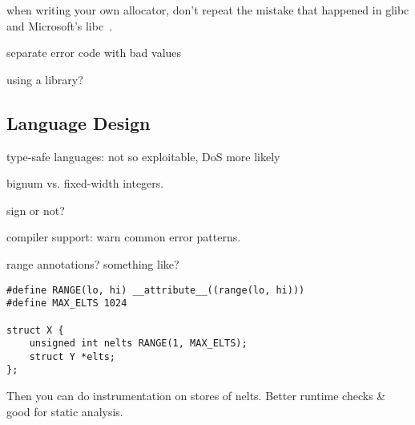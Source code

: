 when writing your own allocator, don't repeat the mistake that
happened in glibc and Microsoft's libc~\cite{rus-cert:calloc}.

separate error code with bad values

using a library?

\subsection{Language Design}

type-safe languages: not so exploitable, DoS more likely

bignum vs. fixed-width integers.

sign or not?

compiler support: warn common error patterns.

range annotations?  something like?
\begin{Verbatim}
#define RANGE(lo, hi) __attribute__((range(lo, hi)))
#define MAX_ELTS 1024

struct X {
	unsigned int nelts RANGE(1, MAX_ELTS);
	struct Y *elts;
};
\end{Verbatim}
Then you can do instrumentation on stores of nelts.
Better runtime checks \& good for static analysis.

